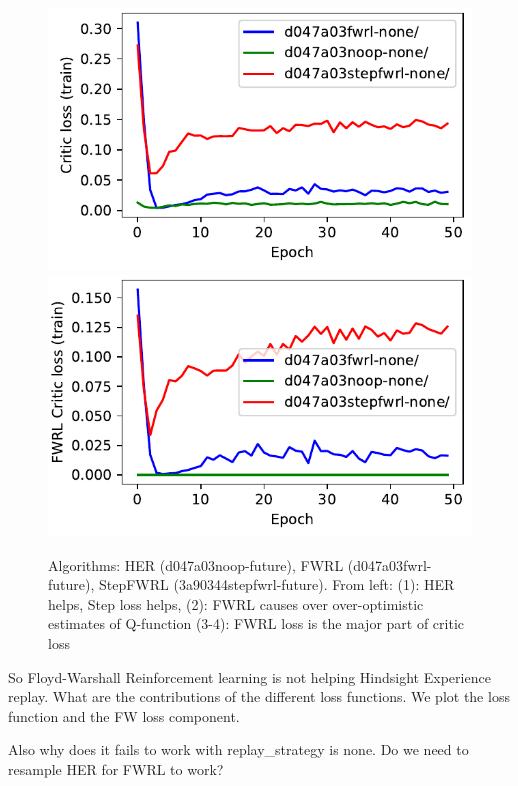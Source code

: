 \begin{figure}
  \includegraphics[width=\frac\columnwidth]{media/res/d047a03-FetchReach-v1-stepfwrl-none/train/critic_loss.pdf}%
  \includegraphics[width=\frac\columnwidth]{media/res/d047a03-FetchReach-v1-stepfwrl-none/train/critic_addnl_loss.pdf}
  \caption{
    Algorithms: HER (d047a03noop-future), FWRL (d047a03fwrl-future), StepFWRL
    (3a90344stepfwrl-future). 
    From left: (1): HER helps, Step loss helps,
    (2): FWRL causes over over-optimistic estimates of Q-function
    (3-4): FWRL loss is the major part of critic loss}%
  \label{fig:fwrl-stepfwrl-noop-test-sucess-rate}%
\end{figure}%
% 

So Floyd-Warshall Reinforcement learning is not helping Hindsight Experience
replay. What are the contributions of the different loss functions. We plot the
loss function and the FW loss component.

Also why does it fails to work with replay\_strategy is none. Do we need to
resample HER for FWRL to work?

